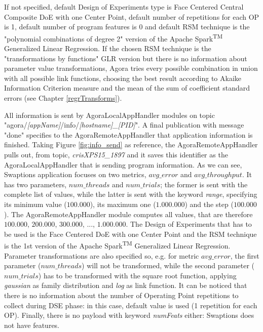 If not specified, default Design of Experiments type is Face Centered Central Composite DoE with one Center Point, default number of repetitions for each OP is 1, default number of program features is 0 and default RSM technique is the "polynomial combinations of degree 2" version of the Apache Spark\textsuperscript{TM} Generalized Linear Regression. If the chosen RSM technique is the "transformations by functions" GLR version but there is no information about parameter value transformations, Agora tries every possible combination in union with all possible link functions, choosing the best result according to Akaike Information Criterion measure and the mean of the sum of coefficient standard errors (see Chapter \ref{regrTransforms}).

All information is sent by AgoraLocalAppHandler modules on topic "agora\slash{}\textit{[appName]}\slash{}info\slash{}\textit{[hostname]\_[PID]}". A final publication with message "done" specifies to the AgoraRemoteAppHandler that application information is finished. Taking Figure \ref{fig:info_send} as reference, the AgoraRemoteAppHandler pulls out, from topic, \textit{crisXPS15\_1897} and it saves this identifier as the AgoraLocalAppHandler that is sending program information. As we can see, Swaptions application focuses on two metrics, $avg\_error$ and $avg\_throughput$. It has two parameters, $num\_threads$ and $num\_trials$; the former is sent with the complete list of values, while the latter is sent with the keyword \textit{range}, specifying its minimum value ($100.000$), its maximum one ($1.000.000$) and the step ($100.000$). The Agora\-Remote\-App\-Handler module computes all values, that are therefore $100.000$, $200.000$, $300.000$, ..., $1.000.000$. The Design of Experiments that has to be used is the Face Centered DoE with one Center Point and the RSM technique is the 1st version of the Apache Spark\textsuperscript{TM} Generalized Linear Regression. Parameter transformations are also specified so, e.g. for metric $avg\_error$, the first parameter ($num\_threads$) will not be transformed, while the second parameter ($num\_trials$) has to be transformed with the square root function, applying \textit{gaussian} as family distribution and \textit{log} as link function. It can be noticed that there is no information about the number of Operating Point repetitions to collect during DSE phase: in this case, default value is used (1 repetition for each OP). Finally, there is no payload with keyword \textit{numFeats} either: Swaptions does not have features.

